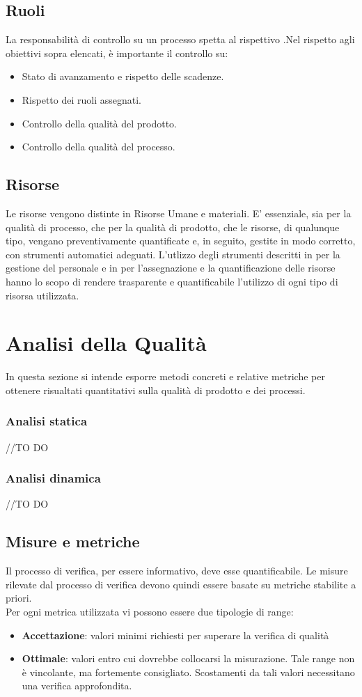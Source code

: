 \documentclass[12pt,a4paper]{article}
\begin{document}
\subsection{Ruoli}
La responsabilità di controllo su un processo spetta al rispettivo \PM{}.Nel rispetto agli obiettivi sopra elencati, è importante il controllo su:
\begin{itemize}
	\item Stato di avanzamento e rispetto delle scadenze.
	\item Rispetto dei ruoli assegnati.
	\item Controllo della qualità del prodotto.
	\item Controllo della qualità del processo. 
\end{itemize}

\subsection{Risorse}
Le risorse vengono distinte in Risorse Umane e materiali. E' essenziale, sia per la qualità di processo, che per la qualità di prodotto, che le risorse, di qualunque tipo, vengano preventivamente quantificate e, in seguito, gestite in modo corretto, con strumenti automatici adeguati.
L'utlizzo degli strumenti descritti in \NdP{} per la gestione del personale e in \PdP{} per l'assegnazione e la quantificazione delle risorse hanno lo scopo di rendere trasparente e quantificabile l'utilizzo di ogni tipo di risorsa utilizzata.

\section{Analisi della Qualità}
In questa sezione si intende esporre metodi concreti e relative metriche per ottenere risualtati quantitativi sulla qualità di prodotto e dei processi. 
\subsubsection{Analisi statica}
//TO DO \AVI
\subsubsection{ Analisi dinamica}
//TO DO \AVI
\subsection{Misure e metriche}\label{metriche}
Il processo di verifica, per essere informativo, deve esse quantificabile. Le misure rilevate dal processo di verifica devono quindi essere basate su metriche stabilite a priori.\\
Per ogni metrica utilizzata vi possono essere due tipologie di range:
\begin{itemize}
\item \textbf{Accettazione}: valori minimi richiesti per superare la verifica di qualità
\item \textbf{Ottimale}: valori entro cui dovrebbe collocarsi la misurazione. Tale range non è vincolante, ma fortemente consigliato. Scostamenti da tali valori necessitano una verifica approfondita.
\end{itemize}
\end{document}
